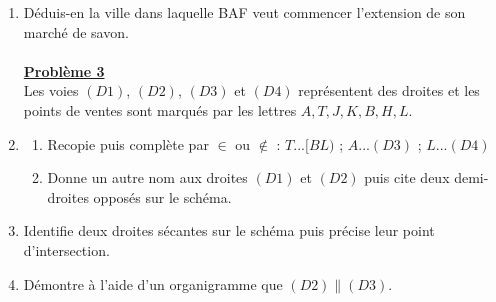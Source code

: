 \documentclass[12pt,a4paper]{article}
\begin{document}
\begin{enumerate}
\begin{tabular}{|p{2cm}|p{2.5cm}|p{3cm}|p{3cm}|p{3cm}|}
\hline
Latitude & & & & \\
\hline
\end{tabular}
\item Déduis-en la ville dans laquelle BAF veut commencer l'extension de son marché de savon. \\ \\
\underline{\textbf{Problème 3}} \\ Les voies $(D1)$, $(D2)$, $(D3)$ et $(D4)$ représentent des droites et les points de ventes sont marqués par les lettres $A, T, J, K, B, H, L$.
\item 
\begin{enumerate}
\item Recopie puis complète par $\in$ ou $\notin$ : $T...[BL)$ ; $A...(D3)$ ; $L...(D4)$ 
\item Donne un autre nom aux droites $(D1)$ et $(D2)$ puis cite deux demi-droites opposés sur le schéma.
\end{enumerate}
\item Identifie deux droites sécantes sur le schéma puis précise leur point d'intersection.
\item Démontre à l'aide d'un organigramme que $(D2) \parallel (D3)$.
\end{enumerate}
\end{document}
